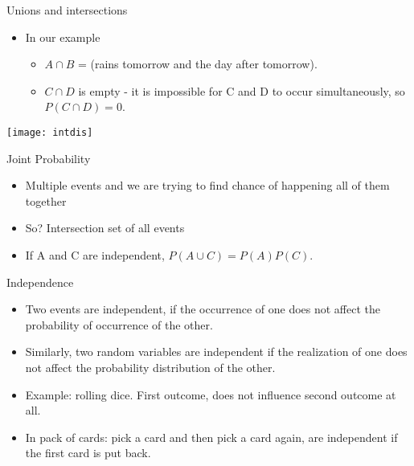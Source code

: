 \begin{frame}{Unions and intersections }
\begin{itemize}
\item In our example  
\begin{itemize}
\item $A \cap B$  = (rains tomorrow and the day after tomorrow).  
\item  $C \cap D$  is empty - it is impossible for C and D to occur 
simultaneously, so $P(C \cap D)= 0$. 
\end{itemize}

\end{itemize}
\begin{center}
\texttt{[image: intdis]}
\end{center}
\end{frame}

\begin{frame}{Joint Probability}

\begin{itemize}
\item Multiple events and we are trying to find chance of happening all of them together
\item So? Intersection set of all events
\item  If A and C are independent, $P(A \cup C) = P(A)P(C)$. 
\end{itemize}
\end{frame}



\begin{frame}{Independence }

\begin{itemize}
\item Two events are independent, if the occurrence of one does not affect the probability of occurrence of the other.
\item Similarly, two random variables are independent if the realization of one does not affect the
probability distribution of the other.
\item Example: rolling dice. First outcome, does not influence second outcome at all.
\item In pack of cards: pick a card and then pick a card again, are independent if the first card is put back.
\end{itemize}
\end{frame}

